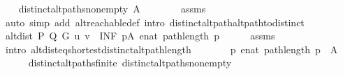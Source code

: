 \begin{isabellebody}
\isanewline
\ \ \isamarkupfalse%
\ distinct{\isacharunderscore}{\kern0pt}alt{\isacharunderscore}{\kern0pt}paths{\isacharunderscore}{\kern0pt}non{\isacharunderscore}{\kern0pt}empty{\isacharcolon}{\kern0pt}\ {\isachardoublequoteopen}{\isacharquery}{\kern0pt}A\ {\isasymnoteq}\ {\isacharbraceleft}{\kern0pt}{\isacharbraceright}{\kern0pt}{\isachardoublequoteclose}\isanewline
\ \ \ \ \isamarkupfalse%
\ assms\isanewline
\ \ \ \ \isamarkupfalse%
\ {\isacharparenleft}{\kern0pt}auto\ simp\ add{\isacharcolon}{\kern0pt}\ alt{\isacharunderscore}{\kern0pt}reachable{\isacharunderscore}{\kern0pt}def\ intro{\isacharcolon}{\kern0pt}\ distinct{\isacharunderscore}{\kern0pt}alt{\isacharunderscore}{\kern0pt}path{\isacharunderscore}{\kern0pt}alt{\isacharunderscore}{\kern0pt}path{\isacharunderscore}{\kern0pt}to{\isacharunderscore}{\kern0pt}distinct{\isacharparenright}{\kern0pt}\isanewline
\isanewline
\ \ \isamarkupfalse%
\ {\isachardoublequoteopen}alt{\isacharunderscore}{\kern0pt}dist\ P\ Q\ G\ u\ v\ {\isacharequal}{\kern0pt}\ {\isacharparenleft}{\kern0pt}INF\ p{\isasymin}{\isacharquery}{\kern0pt}A{\isachardot}{\kern0pt}\ enat\ {\isacharparenleft}{\kern0pt}path{\isacharunderscore}{\kern0pt}length\ p{\isacharparenright}{\kern0pt}{\isacharparenright}{\kern0pt}{\isachardoublequoteclose}\isanewline
\ \ \ \ \isamarkupfalse%
\ assms{\isacharparenleft}{\kern0pt}{}{\isacharparenright}{\kern0pt}\isanewline
\ \ \ \ \isamarkupfalse%
\ {\isacharparenleft}{\kern0pt}intro\ alt{\isacharunderscore}{\kern0pt}dist{\isacharunderscore}{\kern0pt}eq{\isacharunderscore}{\kern0pt}shortest{\isacharunderscore}{\kern0pt}distinct{\isacharunderscore}{\kern0pt}alt{\isacharunderscore}{\kern0pt}path{\isacharunderscore}{\kern0pt}length{\isacharparenright}{\kern0pt}\isanewline
\ \ \isamarkupfalse%
\ \isamarkupfalse%
\ {\isachardoublequoteopen}{\isachardot}{\kern0pt}{\isachardot}{\kern0pt}{\isachardot}{\kern0pt}\ {\isasymin}\ {\isacharparenleft}{\kern0pt}{\isasymlambda}p{\isachardot}{\kern0pt}\ enat\ {\isacharparenleft}{\kern0pt}path{\isacharunderscore}{\kern0pt}length\ p{\isacharparenright}{\kern0pt}{\isacharparenright}{\kern0pt}\ {\isacharbackquote}{\kern0pt}\ {\isacharquery}{\kern0pt}A{\isachardoublequoteclose}\isanewline
\ \ \ \ \isamarkupfalse%
\ distinct{\isacharunderscore}{\kern0pt}alt{\isacharunderscore}{\kern0pt}paths{\isacharunderscore}{\kern0pt}finite\ distinct{\isacharunderscore}{\kern0pt}alt{\isacharunderscore}{\kern0pt}paths{\isacharunderscore}{\kern0pt}non{\isacharunderscore}{\kern0pt}empty\isanewline

\end{isabellebody}
